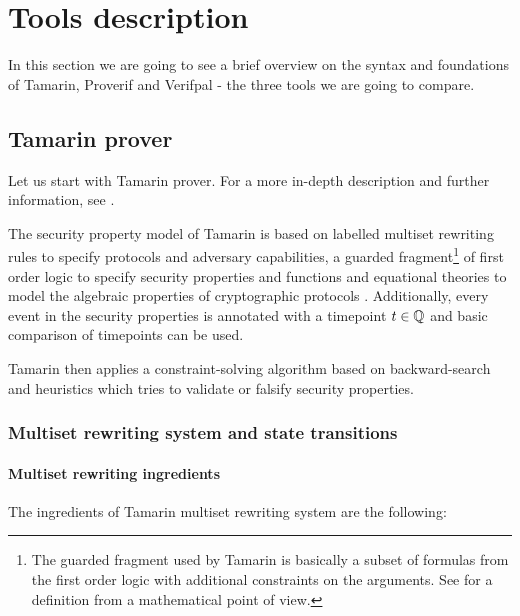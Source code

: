 
\section{Tools description}
\label{section:foundations}

In this section we are going to see a brief overview on the syntax and foundations of Tamarin, Proverif and Verifpal - the three tools we are going to compare.


\subsection{Tamarin prover}
Let us start with Tamarin prover. For a more
in-depth description and further information, see \cite{TamarinFoundations, TamarinFoundationsExtended, TamarinManual}.

The security property model of Tamarin is based on labelled multiset rewriting rules to specify protocols and adversary capabilities, a guarded fragment\footnote{The guarded fragment used by Tamarin is basically a subset of formulas from the first order logic with additional constraints on the arguments. See \cite{FragmentFirstOrderLogicPaper} for a definition from a mathematical point of view.} of first order logic to specify security properties and functions and equational theories to model the algebraic properties of cryptographic protocols \cite{TamarinFoundations}. Additionally, every event in the security properties is annotated with a timepoint $t \in \mathbb{Q}$ and basic comparison of timepoints can be used.

Tamarin then applies a constraint-solving algorithm based on backward-search and heuristics which tries to validate or falsify security properties.

\subsubsection{Multiset rewriting system and state transitions}

\paragraph{Multiset rewriting ingredients} The ingredients of Tamarin multiset rewriting system are the following:

